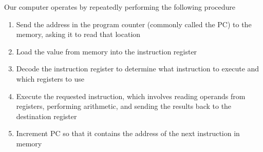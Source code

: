 \documentclass[8pt,a4paper,compress]{beamer}
\begin{document}
\begin{frame}[fragile]
\pause

Our computer operates by repeatedly performing the following procedure
\begin{enumerate}
\pause
\item Send the address in the program counter (commonly called the PC) to the memory, asking it to read that location

\pause
\item Load the value from memory into the instruction register

\pause
\item Decode the instruction register to determine what instruction to execute and which registers to use

\pause
\item Execute the requested instruction, which involves reading operands from registers, performing arithmetic, and sending the results back to the destination register

\pause
\item Increment PC so that it contains the address of the next instruction in memory
\end{enumerate}

\begin{center}
\end{center}
\end{frame}
\end{document}

